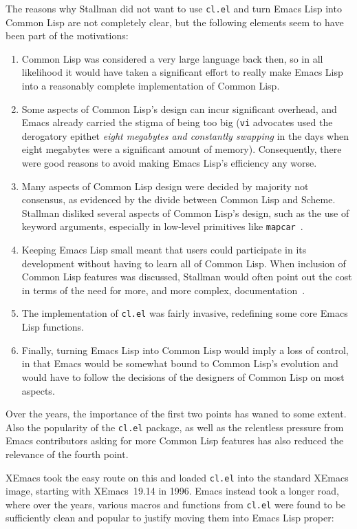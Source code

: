 \documentclass[format=acmsmall,screen]{acmart}
\newcommand \Elisp {Emacs Lisp}
\begin{document}
The reasons why Stallman did not want to use \texttt{cl.el} and turn \Elisp{}
into Common Lisp are not completely clear, but the following elements seem
to have been part of the motivations:
\begin{enumerate}
\item Common Lisp was considered a very large language back then, so in all
  likelihood it would have taken a significant effort to really make
  \Elisp{} into a reasonably complete implementation of Common Lisp.
\item Some aspects of Common Lisp's design can incur 
  significant overhead, and Emacs already carried the stigma of being
  too big (\texttt{vi} advocates used the derogatory epithet \emph{eight
  megabytes and
    constantly swapping} in the days when eight megabytes were a
  significant amount of memory).  Consequently, there were good reasons to avoid making
  \Elisp{}'s efficiency any worse.
\item Many aspects of Common Lisp design were decided by majority not consensus, as
  evidenced by the divide between Common Lisp and Scheme.
  Stallman disliked several aspects of Common Lisp's design, such as the use of
  keyword arguments, especially in low-level primitives like
  \texttt{mapcar}~\cite{RMS-keyword-args-are-clunky}.
\item Keeping \Elisp{} small meant that users could participate in its
  development without having to learn all of Common Lisp.  When inclusion of
  Common Lisp features was discussed, Stallman would often point out the cost
  in terms of the need for more, and more complex,
  documentation~\cite{RMS-cl-big-doc}.
\item The implementation of \texttt{cl.el} was fairly invasive, redefining
  some core \Elisp{} functions.
\item Finally, turning \Elisp{} into Common Lisp would imply a loss of control,
  in that Emacs would be somewhat bound to Common Lisp's evolution and would
  have to follow the decisions of the designers of Common Lisp on most aspects.
\end{enumerate}
Over the years, the importance of the first two points has waned to some
extent.  Also the popularity of the \texttt{cl.el} package, as well as the
relentless pressure from Emacs contributors asking for more Common Lisp
features has also reduced the relevance of the fourth point.

XEmacs took the easy route on this and loaded \texttt{cl.el} into the
standard XEmacs image, starting with XEmacs~19.14 in 1996.  Emacs instead
took a longer road, where over the years, various macros and functions from
\texttt{cl.el} were found to be sufficiently clean and popular to justify
moving them into \Elisp{} proper:
\end{document}
